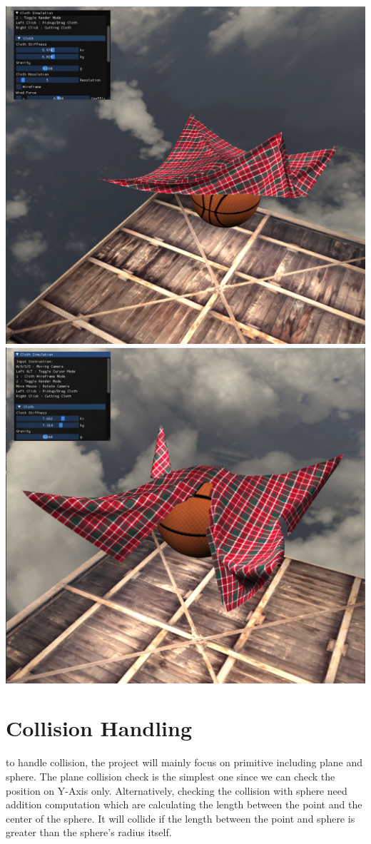\documentclass{article}
\begin{document}
\begin{multicols}{2}
\centering
\includegraphics[scale = 0.15]{ClothDragging}
\includegraphics[scale = 0.15]{ClothCutting}\newline

\justify
\section{Collision Handling}
to handle collision, the project will mainly focus on primitive including plane and sphere. The plane collision check is the simplest one since we can check the position on Y-Axis only. Alternatively, checking the collision with sphere need addition computation
which are calculating the length between the point and the center of the sphere. It will collide if the length between the point and sphere is greater than the sphere's radius itself.\newline


\end{multicols}
\end{document}

